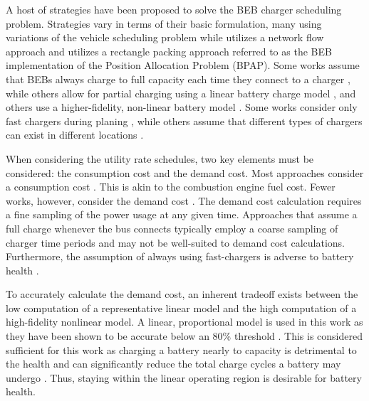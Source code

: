 \documentclass[energies,article,submit,moreauthors]{Definitions/mdpi}
\begin{document}
A host of strategies have been proposed to solve the BEB charger scheduling problem. Strategies vary in terms of their
basic formulation, many using variations of the vehicle scheduling problem
\cite{zhang-2021-optim-elect,duan-2021-refor-mixed,rinaldi-2020-mixed-fleet,tang-2019-robus-sched,li-2014-trans-bus,he-2020-optim-charg}
while \cite{whitaker-2023-a-network} utilizes a network flow approach and \cite{brown-2024-posit-alloc} utilizes a
rectangle packing approach referred to as the BEB implementation of the Position Allocation Problem (BPAP). Some works
assume that BEBs always charge to full capacity each time they connect to a charger
\cite{duan-2021-refor-mixed,zhang-2021-optim-elect,zhou-2020-bi-objec,wang-2017-elect-vehic}, while others allow for
partial charging using a linear battery charge model
\cite{wei-2018-optim-spatio,he-2020-optim-charg,mortensen-2023-cost-minim}, and others use a higher-fidelity,
non-linear battery model
\cite{whitaker-2023-a-network,zhang-2021-optim-elect,qin-2016-numer-analy,jahic-2019-preem,frendo-2021-open-sourc}.
Some works consider only fast chargers during planing
\cite{zhou-2020-collab-optim,li-2014-trans-bus,wang-2017-optim-rechar,sebastiani-2016-evaluat-elect,wei-2018-optim-spatio},
while others assume that different types of chargers can exist in different locations
\cite{tang-2019-robus-sched,he-2020-optim-charg}.

When considering the utility rate schedules, two key elements must be considered: the consumption cost and the demand
cost. Most approaches consider a consumption cost
\cite{jahic-2019-preem,frendo-2021-open-sourc,qin-2016-numer-analy,zhou-2020-bi-objec,duan-2021-refor-mixed,mortensen-2023-cost-minim,zhou-2020-collab-optim,rinaldi-2020-mixed-fleet}.
This is akin to the combustion engine fuel cost. Fewer works, however, consider the demand cost
\cite{jahic-2019-preem,frendo-2021-open-sourc,qin-2016-numer-analy,mortensen-2023-cost-minim,he-2020-optim-charg}.
The demand cost calculation requires a fine sampling of the power usage at any given time. Approaches that assume a full
charge whenever the bus connects typically employ a coarse sampling of charger time periods and may not be well-suited
to demand cost calculations. Furthermore, the assumption of always using fast-chargers is adverse to battery health
\cite{zhou-2020-bi-objec,millner-2010-model-lithium,edge-2021-lithium}.

To accurately calculate the demand cost, an inherent tradeoff exists between the low computation of a representative
linear model and the high computation of a high-fidelity nonlinear model. A linear, proportional model is used in this
work as they have been shown to be accurate below an 80\% threshold \cite{li-2016-batter-elect}. This is considered
sufficient for this work as charging a battery nearly to capacity is detrimental to the health and can significantly
reduce the total charge cycles a battery may undergo \cite{edge-2021-lithium,millner-2010-model-lithium}. Thus,
staying within the linear operating region is desirable for battery health.
\end{document}
